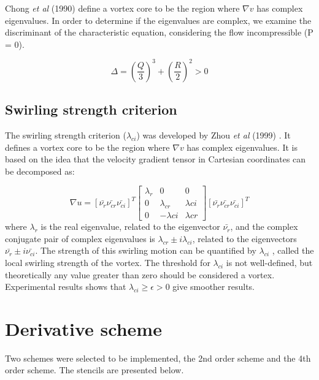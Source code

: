 \documentclass[12pt, a4paper, openany]{memoir}
\begin{document}
Chong \textit{et al} (1990) \cite{chong1990} define a vortex core to be the region where $\nabla v$ has complex eigenvalues. In order to determine if the eigenvalues are complex, we examine the discriminant of the characteristic equation, considering the flow incompressible (P = 0).

\begin{equation}
\Delta = \left(\frac{Q}{3}\right)^3 + \left(\frac{R}{2}\right)^2 > 0
\end{equation}


\subsection{Swirling strength criterion}

The swirling strength criterion ($\lambda_{ci}$) was developed by Zhou \textit{et al} (1999) \cite{zhou1999}. It defines a vortex core to be the region where $\nabla v$ has complex eigenvalues. It is based on the idea that the velocity gradient tensor in Cartesian coordinates can be decomposed as:

\begin{equation}
\nabla u = [\bar{\nu_r} \bar{\nu_{cr}} \bar{\nu_{ci}}]^T
\left[\begin{array}{ccc}
\lambda_r & 0 & 0 \\
0 & \lambda_{cr} & \lambda{ci} \\
0 & -\lambda{ci} & \lambda{cr} \end{array}\right]
[\bar{\nu_r} \bar{\nu_{cr}} \bar{\nu_{ci}}]^T
\end{equation} 
where $\lambda_r$ is the real eigenvalue, related to the eigenvector $\bar{\nu_r}$, and the complex conjugate pair of complex eigenvalues is $\lambda_{cr}  \pm i\lambda_{ci}$, related to the eigenvectors $\bar{\nu_r} \pm i\bar{\nu_{ci}}$. The strength of this swirling motion can be quantified by $\lambda_{ci}$ , called the local swirling strength of the vortex. The threshold for $\lambda_{ci}$ is not well-defined, but theoretically any value greater than zero should be considered a vortex. Experimental results \cite{zhou1999} shows that $\lambda_{ci} \geq \epsilon > 0$ give smoother results.

\section{Derivative scheme}
Two schemes were selected to be implemented, the 2nd order scheme and the 4th order scheme. The stencils are presented below.
\end{document}
